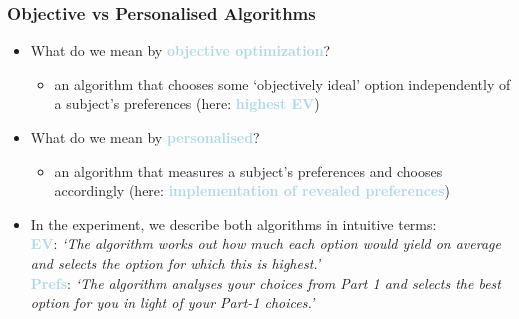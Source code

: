 \documentclass[xcolor=dvipsnames, 10pt]{beamer}
\begin{document}
    \begin{frame}
	\frametitle{Objective vs Personalised Algorithms\vspace{.3cm}}
	\begin{itemize}
	\setlength\itemsep{1em}
	\item What do we mean by \textcolor{lightblue}{\textbf{objective optimization}}?%
  \begin{itemize}
	\item an algorithm that chooses some ‘objectively ideal’ option independently of a subject’s preferences (here: \textcolor{lightblue}{\textbf{highest EV}})\vspace{-.2cm}
   \end{itemize}
	\item What do we mean by \textcolor{lightblue}{\textbf{personalised}}?%
  \begin{itemize}
	\item an algorithm that measures a subject’s preferences and chooses accordingly (here: \textcolor{lightblue}{\textbf{implementation of revealed preferences}})\vspace{-.2cm}
  \end{itemize}
	\item In the experiment, we describe both algorithms in intuitive terms:\\\medskip \textcolor{lightblue}{\textbf{EV}}: \textit{‘The algorithm works out how much each option would yield on average and selects the option for which this is highest.’}\\\smallskip
  \textcolor{lightblue}{\textbf{Prefs}}: \textit{‘The algorithm analyses your choices from Part 1 and selects the best option for you in light of your Part-1 choices.’}
 	\end{itemize}
 	\end{frame}
\end{document}

